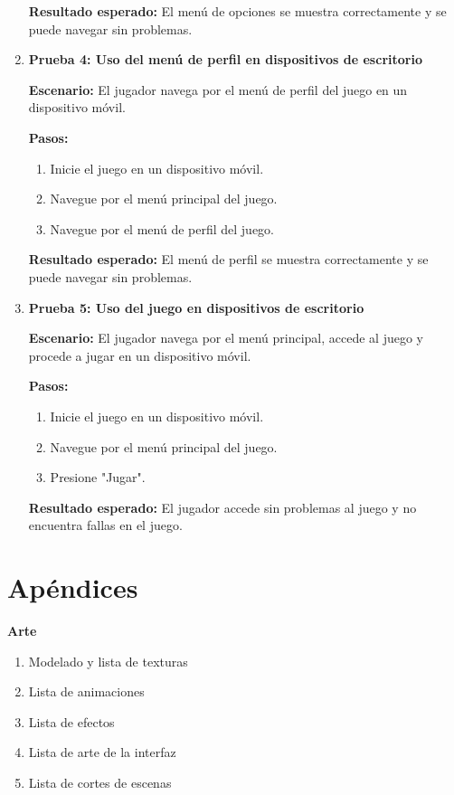 \begin{enumerate}
	      \textbf{Resultado esperado:} El menú de opciones se muestra correctamente y se puede navegar sin problemas.

	\item \textbf{Prueba 4: Uso del menú de perfil en dispositivos de escritorio}

	      \textbf{Escenario:} El jugador navega por el menú de perfil del juego en un dispositivo móvil.

	      \textbf{Pasos:}
	      \begin{enumerate}
		      \item Inicie el juego en un dispositivo móvil.
		      \item Navegue por el menú principal del juego.
		      \item Navegue por el menú de perfil del juego.
	      \end{enumerate}

	      \textbf{Resultado esperado:} El menú de perfil se muestra correctamente y se puede navegar sin problemas.

	\item \textbf{Prueba 5: Uso del juego en dispositivos de escritorio}

	      \textbf{Escenario:} El jugador navega por el menú principal, accede al juego y procede a jugar en un dispositivo móvil.

	      \textbf{Pasos:}
	      \begin{enumerate}
		      \item Inicie el juego en un dispositivo móvil.
		      \item Navegue por el menú principal del juego.
		      \item Presione "Jugar".
	      \end{enumerate}

	      \textbf{Resultado esperado:} El jugador accede sin problemas al juego y no encuentra fallas en el juego.

\end{enumerate}

\section{Apéndices}
\textbf{Arte}

\begin{enumerate}
	\item Modelado y lista de texturas
	\item Lista de animaciones
	\item Lista de efectos
	\item Lista de arte de la interfaz
	\item Lista de cortes de escenas
\end{enumerate}

